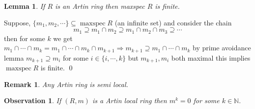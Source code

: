 \documentclass[11pt]{amsart}
\newtheorem{obs}[theorem]{Observation}
\newtheorem{remark}[theorem]{Remark}%
\newtheorem{lemma}[theorem]{Lemma}%
\newcommand{\NN}{\mathbb N}
\begin{document}
\begin{lemma}
If $R$ is an Artin ring then maxspec $R$ is finite.
\end{lemma}

\proof Suppose, $\{m_1,m_2,\cdots \}\subseteq \operatorname{maxspec}R$ (an infinite set) and consider the chain $$m_1\supseteq m_1\cap m_2\supseteq m_1\cap m_2\cap m_3\supseteq \cdots$$ then for some $k$ we get $m_1\cap\cdots \cap m_k=m_1\cap\cdots \cap m_k\cap m_{k+1} \Rightarrow m_{k+1}\supseteq m_1\cap\cdots \cap m_k$ by prime avoidance lemma $m_{k+1}\supseteq m_i$ for some $i\in \{i,\cdots ,k\}$ but $m_{k+1},m_i$ both maximal this implies $\operatorname{maxspec}R$ is finite. \qed

\begin{remark}
Any Artin ring is semi local.
\end{remark}

\begin{obs}
If $(R,m)$ is a Artin local ring then $m^k=0$ for some $k\in {\NN}.$
\end{obs}





























































\newpage
\end{document}
